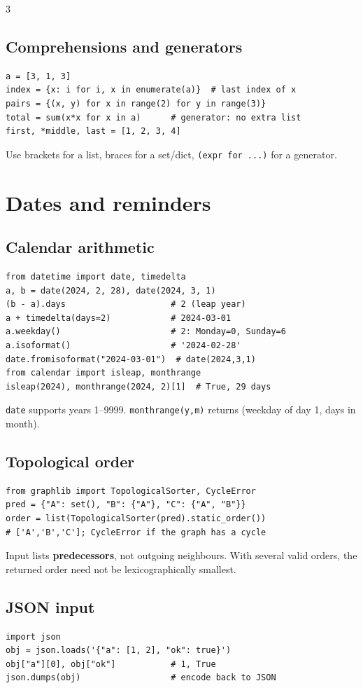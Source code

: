 \documentclass[9pt]{extarticle}
\let\referenceSubsection\subsection
\renewcommand{\subsection}{\needspace{4\baselineskip}\referenceSubsection}
\newcommand{\hint}[1]{{\small #1\par}}
\begin{document}
\begin{multicols*}{3}
\subsection{Comprehensions and generators}
\begin{lstlisting}[label=py:comprehensions]
a = [3, 1, 3]
index = {x: i for i, x in enumerate(a)}  # last index of x
pairs = {(x, y) for x in range(2) for y in range(3)}
total = sum(x*x for x in a)      # generator: no extra list
first, *middle, last = [1, 2, 3, 4]
\end{lstlisting}
\hint{Use brackets for a list, braces for a set/dict,
\texttt{(expr for ...)} for a generator.}

\section{Dates and reminders}

\subsection{Calendar arithmetic}
\begin{lstlisting}[label=py:dates]
from datetime import date, timedelta
a, b = date(2024, 2, 28), date(2024, 3, 1)
(b - a).days                     # 2 (leap year)
a + timedelta(days=2)            # 2024-03-01
a.weekday()                      # 2: Monday=0, Sunday=6
a.isoformat()                    # '2024-02-28'
date.fromisoformat("2024-03-01")  # date(2024,3,1)
from calendar import isleap, monthrange
isleap(2024), monthrange(2024, 2)[1]  # True, 29 days
\end{lstlisting}
\hint{\texttt{date} supports years 1--9999.
\texttt{monthrange(y,m)} returns (weekday of day 1, days in month).}

\subsection{Topological order}
\begin{lstlisting}[label=py:topological]
from graphlib import TopologicalSorter, CycleError
pred = {"A": set(), "B": {"A"}, "C": {"A", "B"}}
order = list(TopologicalSorter(pred).static_order())
# ['A','B','C']; CycleError if the graph has a cycle
\end{lstlisting}
\hint{Input lists \textbf{predecessors}, not outgoing neighbours.
With several valid orders, the returned order need not be
lexicographically smallest.}

\subsection{JSON input}
\begin{lstlisting}[label=py:json]
import json
obj = json.loads('{"a": [1, 2], "ok": true}')
obj["a"][0], obj["ok"]           # 1, True
json.dumps(obj)                  # encode back to JSON
\end{lstlisting}


\end{multicols*}
\end{document}
